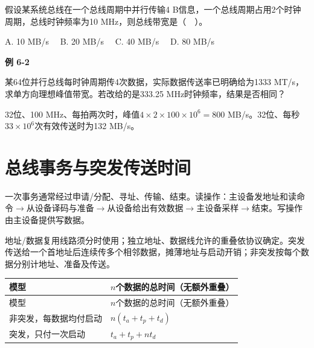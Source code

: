 假设某系统总线在一个总线周期中并行传输4 B信息，一个总线周期占用2个时钟周期，总线时钟频率为10 MHz，则总线带宽是（　）。

A. 10 MB/s　 B. 20 MB/s　 C. 40 MB/s　 D. 80 MB/s

\par\medskip{}\noindent\hypertarget{CO06-E02}{}\label{CO06-E02}\textbf{例 6-2}\par\nobreak\smallskip

某64位并行总线每时钟周期传4次数据，实际数据传送率已明确给为1333 MT/s，求单方向理想峰值带宽。若改给的是333.25 MHz时钟频率，结果是否相同？

32位、100 MHz、每拍两次时，峰值\(4\times2\times100\times10^6=800\) MB/s。32位、每秒\(33\times10^6\)次有效传送时为132 MB/s。

\section{总线事务与突发传送时间}\label{CO06-transactions}

一次事务通常经过申请/分配、寻址、传输、结束。读操作：主设备发地址和读命令\ensuremath{\to}从设备译码与准备\ensuremath{\to}从设备给出有效数据\ensuremath{\to}主设备采样\ensuremath{\to}结束。写操作由主设备提供写数据。

地址/数据复用线路须分时使用；独立地址、数据线允许的重叠依协议确定。突发传送给一个首地址后连续传多个相邻数据，摊薄地址与启动开销；非突发按每个数据分别计地址、准备及传送。

\par\smallskip
{\fontsize{9.3}{12}\selectfont\setlength{\tabcolsep}{2.5pt}\setlength{\LTleft}{0pt}\setlength{\LTright}{0pt}
\begin{longtable}{@{}>{\raggedright\arraybackslash}p{}>{\raggedright\arraybackslash}p{}@{}}
\toprule
模型 & \(n\)个数据的总时间（无额外重叠） \\

\midrule\endfirsthead\toprule
模型 & \(n\)个数据的总时间（无额外重叠） \\

\midrule\endhead\bottomrule\endfoot
非突发，每数据均付启动 & \(n(t_a+t_p+t_d)\) \\

突发，只付一次启动 & \(t_a+t_p+nt_d\) \\

\end{longtable}}
\par\smallskip

